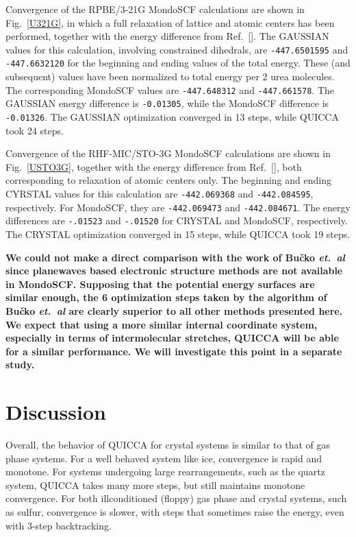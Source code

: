 \twolinestyle{\documentclass[prb,preprint]{revtex4}}
\begin{document}
Convergence of the RPBE/3-21G {\sc MondoSCF} calculations are shown in Fig.~\ref{U321G}, 
in which a full relaxation of lattice and atomic centers has been performed, together
with the energy difference from Ref.~[]. The {\sc GAUSSIAN} values for this 
calculation, involving constrained dihedrals, are {\tt -447.6501595} and {\tt -447.6632120} for the 
beginning and ending values of the total energy.  These (and subsequent) values have been normalized to 
total energy per 2 urea molecules.  The corresponding {\sc MondoSCF} values are {\tt -447.648312} 
and {\tt -447.661578}. The {\sc GAUSSIAN} energy difference is {\tt -0.01305}, while 
the {\sc MondoSCF} difference is {\tt -0.01326}.   The {\sc GAUSSIAN} optimization converged 
in 13 steps, while QUICCA took 24 steps.

Convergence of the RHF-MIC/STO-3G {\sc MondoSCF} calculations are shown in Fig.~\ref{USTO3G}, together
with the energy difference from Ref.~[], both corresponding to 
relaxation of atomic centers only.   The beginning and ending {\sc CYRSTAL} values for this 
calculation are {\tt -442.069368} and {\tt -442.084595}, respectively.  For {\sc MondoSCF},
they are {\tt -442.069473} and {\tt -442.084671}.  The energy differences are {\tt -.01523} and
{\tt -.01520} for {\sc CRYSTAL} and {\sc MondoSCF}, respectively.  The {\sc CRYSTAL} optimization
converged in 15 steps, while QUICCA took 19 steps.

{\bf
We could not make a direct comparison with the work of Bu\v{c}ko {\em et.~al} \cite{TBucko05}
since planewaves based electronic structure methods are not available in {\sc MondoSCF}.
Supposing that the potential energy surfaces are similar enough, 
the 6 optimization steps taken by the algorithm of Bu\v{c}ko {\em et.~al} 
are clearly superior to all other methods presented here.
We expect that using a more similar internal coordinate system, 
especially in terms of intermolecular stretches, QUICCA will
be able for a similar performance. We will investigate this point in a 
separate study.
}

\section{Discussion}\label{discussion}

Overall,  the behavior of QUICCA for crystal systems is similar to that of gas phase systems. 
For a well behaved system like ice, convergence is rapid and monotone. 
For systems undergoing large rearrangements, such as the quartz system, QUICCA
takes many more steps, but still maintains monotone convergence.
For both illconditioned (floppy)  gas phase and crystal systems, such as 
sulfur, convergence is slower, with steps that sometimes raise the energy, 
even with 3-step backtracking.
\end{document}
